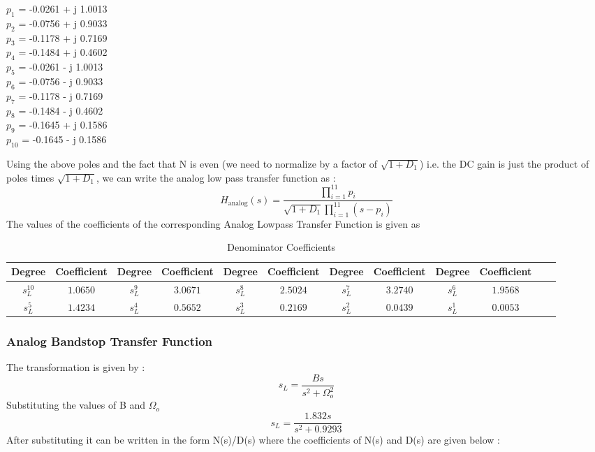 \documentclass{article}
\begin{document}
\noindent
\vspace{1em}
\begin{center}
$p_{ 1 }$ =  -0.0261  + j 1.0013 \\
$p_{ 2 }$ =  -0.0756  + j 0.9033 \\
$p_{ 3 }$ =  -0.1178  + j 0.7169 \\
$p_{ 4 }$ =  -0.1484  + j 0.4602 \\
$p_{ 5 }$ =  -0.0261  - j 1.0013 \\
$p_{ 6 }$ =  -0.0756  - j 0.9033 \\
$p_{ 7 }$ =  -0.1178  - j 0.7169 \\
$p_{ 8 }$ =  -0.1484  - j 0.4602 \\
$p_{ 9 }$ =  -0.1645  + j 0.1586 \\
$p_{ 10 }$ =  -0.1645  - j 0.1586 \\
\end{center}
\noindent
\vspace{1em}
Using the above poles and the fact that N is even (we need to normalize by a factor of $\sqrt{1 + D_1}$) i.e. the DC gain is just the product of poles times $\sqrt{1 + D_1}$, we can write the analog low pass transfer function as :
\begin{equation*}
        H_{\text{analog}}(s) = \frac{\prod_{i=1}^{11} p_i}{\sqrt{1 + D_1} \prod_{i=1}^{11} (s - p_i)}
\end{equation*}
The values of the coefficients of the corresponding Analog Lowpass Transfer Function  is given as
\begin{table}[H]
  \centering
        \begin{adjustwidth}{-2.5cm}{}
        \caption{Denominator Coefficients}
        \begin{tabular}{|c|c|c|c|c|c|c|c|c|c|c|c|}
\hline
Degree & Coefficient & Degree & Coefficient & Degree & Coefficient & Degree & Coefficient & Degree & Coefficient\\
\hline
$s_L^{10}$ & $1.0650$ & $s_L^9$ & $3.0671$ & $s_L^8$ & $2.5024$ & $s_L^7$ & $3.2740$ & $s_L^6$ & $1.9568$ \\
\hline
$s_L^5$ & $1.4234$ & $s_L^4$ & $0.5652$ & $s_L^3$ & $0.2169$ & $s_L^2$ & $0.0439$ & $s_L^1$ & $0.0053$ \\
\hline
  	\end{tabular}
    \end{adjustwidth}
\end{table}

\subsubsection{Analog Bandstop Transfer Function}
The transformation is given by :
\begin{equation*}
    s_L = \frac{Bs}{s^2 + \Omega_o^2 }
\end{equation*}
Substituting the values of B and $\Omega_o$
\begin{equation*}
    s_L = \frac{1.832s}{s^2 + 0.9293}
\end{equation*}
After substituting it can be written in the form N(s)/D(s) where the coefficients of N(s) and D(s) are given below :
\end{document}
